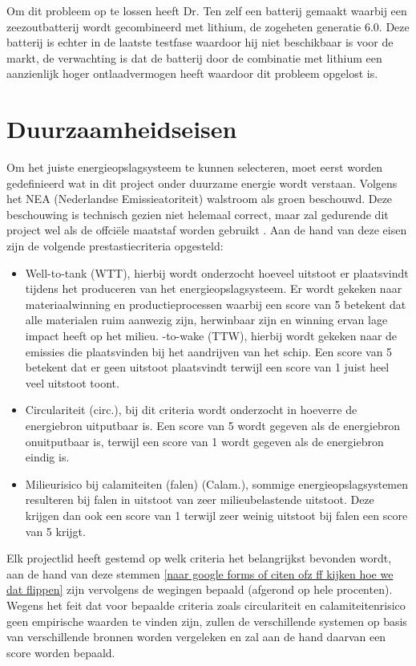 \noindent Om dit probleem op te lossen heeft Dr. Ten zelf een batterij gemaakt waarbij een zeezoutbatterij wordt gecombineerd met lithium, de zogeheten generatie  6.0. Deze batterij is echter in de laatste testfase waardoor hij niet beschikbaar is voor de markt, de verwachting is dat de batterij door de combinatie met lithium een aanzienlijk hoger ontlaadvermogen heeft waardoor dit probleem opgelost is.

\section{Duurzaamheidseisen}
Om het juiste energieopslagsysteem te kunnen selecteren, moet eerst worden gedefinieerd wat in dit project onder duurzame energie wordt verstaan. Volgens het NEA (Nederlandse Emissieatoriteit) \cite{NEAHernieuwbareEnergie} walstroom als groen beschouwd. Deze beschouwing is technisch gezien niet helemaal correct, maar zal gedurende dit project wel als de offciële maatstaf worden gebruikt \label{walstroomgroen}. Aan de hand van deze eisen zijn de volgende prestastiecriteria opgesteld:

\begin{itemize}
    \item Well-to-tank (WTT), hierbij wordt onderzocht hoeveel uitstoot er plaatsvindt tijdens het produceren van het energieopslagsysteem. Er wordt gekeken naar materiaalwinning en productieprocessen waarbij een score van 5 betekent dat alle materialen ruim aanwezig zijn, herwinbaar zijn en winning ervan lage impact heeft op het milieu.
    \itemTank-to-wake (TTW), hierbij wordt gekeken naar de emissies die plaatsvinden bij het aandrijven van het schip. Een score van 5 betekent dat er geen uitstoot plaatsvindt terwijl een score van 1 juist heel veel uitstoot toont.
    \item Circulariteit (circ.), bij dit criteria wordt onderzocht in hoeverre de energiebron uitputbaar is. Een score van 5 wordt gegeven als de energiebron onuitputbaar is, terwijl een score van 1 wordt gegeven als de energiebron eindig is.
    \item Milieurisico bij calamiteiten (falen) (Calam.), sommige energieopslagsystemen resulteren bij falen in uitstoot van zeer milieubelastende uitstoot. Deze krijgen dan ook een score van 1 terwijl zeer weinig uitstoot bij falen een score van 5 krijgt.
\end{itemize}

\noindent Elk projectlid heeft gestemd op welk criteria het belangrijkst bevonden wordt, aan de hand van deze stemmen \ref{naar google forms of citen ofz ff kijken hoe we dat flippen} zijn vervolgens de wegingen bepaald (afgerond op hele procenten). Wegens het feit dat voor bepaalde criteria zoals circulariteit en calamiteitenrisico geen empirische waarden te vinden zijn, zullen de verschillende systemen op basis van verschillende bronnen worden vergeleken en zal aan de hand daarvan een score worden bepaald.

